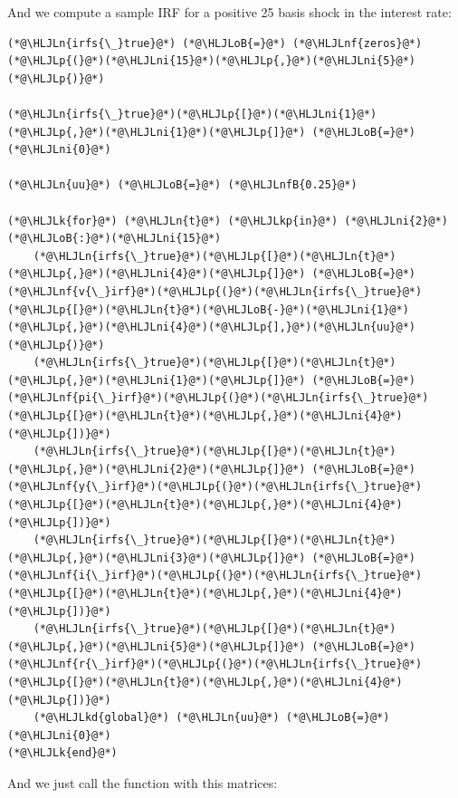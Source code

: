 \documentclass[12pt,a4paper]{article}
\newcommand{\HLJLk}[1]{\textcolor[RGB]{148,91,176}{\textbf{#1}}}
\newcommand{\HLJLkd}[1]{\textcolor[RGB]{214,102,97}{\textit{#1}}}
\newcommand{\HLJLkp}[1]{\textcolor[RGB]{148,91,176}{\textbf{#1}}}
\newcommand{\HLJLn}[1]{#1}
\newcommand{\HLJLnf}[1]{\textcolor[RGB]{66,102,213}{#1}}
\newcommand{\HLJLnfB}[1]{\textcolor[RGB]{59,151,46}{#1}}
\newcommand{\HLJLni}[1]{\textcolor[RGB]{59,151,46}{#1}}
\newcommand{\HLJLoB}[1]{\textcolor[RGB]{102,102,102}{\textbf{#1}}}
\newcommand{\HLJLp}[1]{#1}
\begin{document}
And we compute a sample IRF for a positive 25 basis shock in the interest rate:


\begin{lstlisting}
(*@\HLJLn{irfs{\_}true}@*) (*@\HLJLoB{=}@*) (*@\HLJLnf{zeros}@*)(*@\HLJLp{(}@*)(*@\HLJLni{15}@*)(*@\HLJLp{,}@*)(*@\HLJLni{5}@*)(*@\HLJLp{)}@*)

(*@\HLJLn{irfs{\_}true}@*)(*@\HLJLp{[}@*)(*@\HLJLni{1}@*)(*@\HLJLp{,}@*)(*@\HLJLni{1}@*)(*@\HLJLp{]}@*) (*@\HLJLoB{=}@*) (*@\HLJLni{0}@*)

(*@\HLJLn{uu}@*) (*@\HLJLoB{=}@*) (*@\HLJLnfB{0.25}@*)

(*@\HLJLk{for}@*) (*@\HLJLn{t}@*) (*@\HLJLkp{in}@*) (*@\HLJLni{2}@*)(*@\HLJLoB{:}@*)(*@\HLJLni{15}@*)
    (*@\HLJLn{irfs{\_}true}@*)(*@\HLJLp{[}@*)(*@\HLJLn{t}@*)(*@\HLJLp{,}@*)(*@\HLJLni{4}@*)(*@\HLJLp{]}@*) (*@\HLJLoB{=}@*) (*@\HLJLnf{v{\_}irf}@*)(*@\HLJLp{(}@*)(*@\HLJLn{irfs{\_}true}@*)(*@\HLJLp{[}@*)(*@\HLJLn{t}@*)(*@\HLJLoB{-}@*)(*@\HLJLni{1}@*)(*@\HLJLp{,}@*)(*@\HLJLni{4}@*)(*@\HLJLp{],}@*)(*@\HLJLn{uu}@*)(*@\HLJLp{)}@*)
    (*@\HLJLn{irfs{\_}true}@*)(*@\HLJLp{[}@*)(*@\HLJLn{t}@*)(*@\HLJLp{,}@*)(*@\HLJLni{1}@*)(*@\HLJLp{]}@*) (*@\HLJLoB{=}@*) (*@\HLJLnf{pi{\_}irf}@*)(*@\HLJLp{(}@*)(*@\HLJLn{irfs{\_}true}@*)(*@\HLJLp{[}@*)(*@\HLJLn{t}@*)(*@\HLJLp{,}@*)(*@\HLJLni{4}@*)(*@\HLJLp{])}@*)
    (*@\HLJLn{irfs{\_}true}@*)(*@\HLJLp{[}@*)(*@\HLJLn{t}@*)(*@\HLJLp{,}@*)(*@\HLJLni{2}@*)(*@\HLJLp{]}@*) (*@\HLJLoB{=}@*) (*@\HLJLnf{y{\_}irf}@*)(*@\HLJLp{(}@*)(*@\HLJLn{irfs{\_}true}@*)(*@\HLJLp{[}@*)(*@\HLJLn{t}@*)(*@\HLJLp{,}@*)(*@\HLJLni{4}@*)(*@\HLJLp{])}@*)
    (*@\HLJLn{irfs{\_}true}@*)(*@\HLJLp{[}@*)(*@\HLJLn{t}@*)(*@\HLJLp{,}@*)(*@\HLJLni{3}@*)(*@\HLJLp{]}@*) (*@\HLJLoB{=}@*) (*@\HLJLnf{i{\_}irf}@*)(*@\HLJLp{(}@*)(*@\HLJLn{irfs{\_}true}@*)(*@\HLJLp{[}@*)(*@\HLJLn{t}@*)(*@\HLJLp{,}@*)(*@\HLJLni{4}@*)(*@\HLJLp{])}@*)
    (*@\HLJLn{irfs{\_}true}@*)(*@\HLJLp{[}@*)(*@\HLJLn{t}@*)(*@\HLJLp{,}@*)(*@\HLJLni{5}@*)(*@\HLJLp{]}@*) (*@\HLJLoB{=}@*) (*@\HLJLnf{r{\_}irf}@*)(*@\HLJLp{(}@*)(*@\HLJLn{irfs{\_}true}@*)(*@\HLJLp{[}@*)(*@\HLJLn{t}@*)(*@\HLJLp{,}@*)(*@\HLJLni{4}@*)(*@\HLJLp{])}@*)
    (*@\HLJLkd{global}@*) (*@\HLJLn{uu}@*) (*@\HLJLoB{=}@*) (*@\HLJLni{0}@*)
(*@\HLJLk{end}@*)
\end{lstlisting}


And we just call the function with this matrices:
\end{document}
